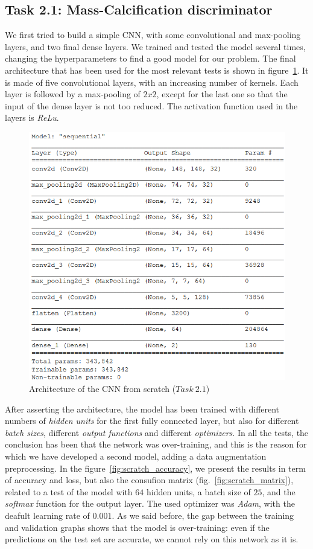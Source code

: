 \documentclass[11pt,a4paper,oneside]{article}
\begin{document}
\subsection{Task 2.1: Mass-Calcification discriminator}
We first tried to build a simple CNN, with some convolutional and max-pooling layers, and two final dense layers. We trained and tested the model several times, changing the hyperparameters to find a good model for our problem. The final architecture that has been used for the most relevant tests is shown in figure~\ref{fig:scratch_model}. It is made of five convolutional layers, with an increasing number of kernels. Each layer is followed by a max-pooling of $2x2$, except for the last one so that the input of the dense layer is not too reduced. The activation function used in the layers is \textit{ReLu}.

\begin{figure}[h]
\centering
\includegraphics[width=.5\textwidth]{images/scratch_model}
\caption{Architecture of the CNN from scratch ($Task\ 2.1$)}
\label{fig:scratch_model}
\end{figure}

After asserting the architecture, the model has been trained with different numbers of \textit{hidden units} for the first fully connected layer, but also for different \textit{batch sizes}, different \textit{output functions} and different \textit{optimizers}. 
In all the tests, the conclusion has been that the network was over-training, and this is the reason for which we have developed a second model, adding a data augmentation preprocessing. 
In the figure~\ref{fig:scratch_accuracy}, we present the results in term of accuracy and loss, but also the consufion matrix (fig.~\ref{fig:scratch_matrix}), related to a test of the model with $64$ hidden units, a batch size of $25$, and the \textit{softmax} function for the output layer. 
The used optimizer was \textit{Adam}, with the deafult learning rate of $0.001$. As we said before, the gap between the training and validation graphs shows that the model is over-training: even if the predictions on the test set are accurate, we cannot rely on this network as it is.
\end{document}
